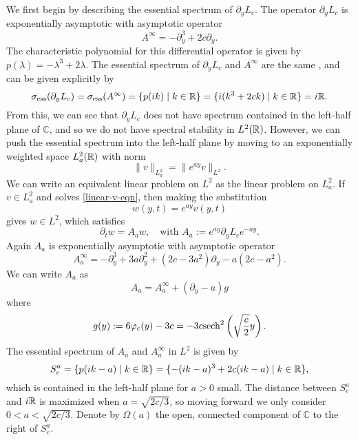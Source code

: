We first begin by describing the essential spectrum of \(\partial_y L_c\). The operator \(\partial_y L_c\) is exponentially asymptotic with asymptotic operator
\begin{equation*} 
	A^\infty = - \partial_y^3 + 2 c\partial_y.
\end{equation*} 
The characteristic polynomial for this differential operator is given by \(p (\lambda) = -\lambda^3 + 2\lambda\). The essential spectrum of \(\partial_y L_c\) and \(A^\infty\) are the same \cite[Thm.~3.1.11]{kapitula2013spectral}, and can be given explicitly by
\begin{equation*} 
	\sigma_{\mathrm{ess}}(\partial_y L_c) = \sigma_{\mathrm{ess}}(A^\infty) = \{p(ik) \mid k \in \mathbb{R}\} = \{i(k^3 +2c k) \mid k \in \mathbb{R}\} = i \mathbb{R}.
\end{equation*} 
From this, we can see that \(\partial_y L_c\) does not have spectrum contained in the left-half plane of \(\mathbb C\), and so we do not have spectral stability in \(L^2(\mathbb{R})\). However, we can push the essential spectrum into the left-half plane by moving to an exponentially weighted space \(L^2_a(\mathbb{R})\) with norm 
\begin{equation*} 
	\|v\|_{L^2_a} = \|e^{ay} v\|_{L^2}.
\end{equation*} 
We can write an equivalent linear problem on \(L^2\) as the linear problem on \(L^2_a\). If \(v\in L^2_a\) and solves \cref{linear-v-eqn}, then making the substitution 
\begin{equation*} 
	w(y,t) = e^{ay} v(y,t)
\end{equation*} 
gives \(w\in L^2\), which satisfies
\begin{equation*} 
	\partial_t w = A_a w, \quad \text{with } A_a := e^{ay} \partial_y L_c e^{-ay}.
\end{equation*} 
Again \(A_a\) is exponentially asymptotic with asymptotic operator
\begin{equation*} 
	A_a^\infty = - \partial_y^3 + 3a\partial_y^2 + (2c - 3a^2) \partial_y - a(2c - a^2).
\end{equation*} 
We can write \(A_a\) as 
\begin{equation*} 
	A_a = A_a^\infty + (\partial_y - a)g
\end{equation*} 
where 
\begin{equation*} 
	g(y) := 6\varphi_c(y) - 3c = - 3c\mathrm{sech}^2\left(\sqrt{\frac c 2} y \right).
\end{equation*} 
The essential spectrum of \(A_a\) and \(A_a^\infty\) in \(L^2\) is given by
\begin{equation*} 
	S^a_e = \{p(ik - a) \mid k \in \mathbb{R}\}= \{ - (ik - a)^3 + 2c(ik - a) \mid k \in \mathbb{R}\},
\end{equation*} 
which is contained in the left-half plane for \(a>0\) small. The distance between \(S^a_e\) and \(i\mathbb{R}\) is maximized when \(a = \sqrt{2c/3}\), so moving forward we only consider \(0< a < \sqrt{2c/3}\). Denote by \(\Omega(a)\) the open, connected component of \(\mathbb C\) to the right of \(S^a_e\). 


